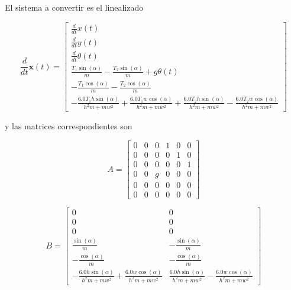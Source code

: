 \documentclass[titlepage, letterpaper]{article}
\begin{document}
El sistema a convertir es el linealizado

\begin{equation*}\frac{d}{d t} \pmb{x}{\left(t \right)} = \left[\begin{matrix}\frac{d}{d t} x{\left(t \right)}\\\frac{d}{d t} y{\left(t \right)}\\\frac{d}{d t} \theta{\left(t \right)}\\\frac{T_{1} \sin{\left(\alpha \right)}}{m} - \frac{T_{2} \sin{\left(\alpha \right)}}{m} + g \theta{\left(t \right)}\\- \frac{T_{1} \cos{\left(\alpha \right)}}{m} - \frac{T_{2} \cos{\left(\alpha \right)}}{m}\\- \frac{6.0 T_{1} h \sin{\left(\alpha \right)}}{h^{2} m + m w^{2}} + \frac{6.0 T_{1} w \cos{\left(\alpha \right)}}{h^{2} m + m w^{2}} + \frac{6.0 T_{2} h \sin{\left(\alpha \right)}}{h^{2} m + m w^{2}} - \frac{6.0 T_{2} w \cos{\left(\alpha \right)}}{h^{2} m + m w^{2}}\end{matrix}\right]\end{equation*}

y las matrices correspondientes son

\begin{equation*}
	A = \left[\begin{matrix}0 & 0 & 0 & 1 & 0 & 0\\0 & 0 & 0 & 0 & 1 & 0\\0 & 0 & 0 & 0 & 0 & 1\\0 & 0 & g & 0 & 0 & 0\\0 & 0 & 0 & 0 & 0 & 0\\0 & 0 & 0 & 0 & 0 & 0\end{matrix}\right]
\end{equation*}

\begin{equation*}
	B = \left[\begin{matrix}0 & 0\\0 & 0\\0 & 0\\\frac{\sin{\left(\alpha \right)}}{m} & - \frac{\sin{\left(\alpha \right)}}{m}\\- \frac{\cos{\left(\alpha \right)}}{m} & - \frac{\cos{\left(\alpha \right)}}{m}\\- \frac{6.0 h \sin{\left(\alpha \right)}}{h^{2} m + m w^{2}} + \frac{6.0 w \cos{\left(\alpha \right)}}{h^{2} m + m w^{2}} & \frac{6.0 h \sin{\left(\alpha \right)}}{h^{2} m + m w^{2}} - \frac{6.0 w \cos{\left(\alpha \right)}}{h^{2} m + m w^{2}}\end{matrix}\right]
\end{equation*}
\end{document}
